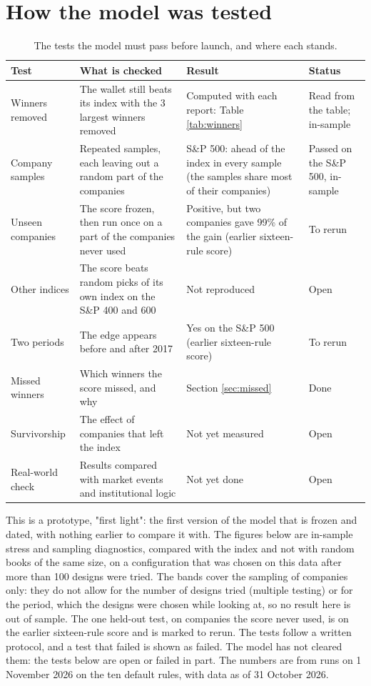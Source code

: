 \documentclass[11pt,a4paper]{article}
\begin{document}
\section{How the model was tested}
\label{sec:testing}
\begin{table}[H]
\centering
\small
\caption{The tests the model must pass before launch, and where each stands.}\label{tab:testing}
\begin{tabular}{l p{3.6cm} p{4.6cm} p{2.3cm}}
\hline
Test & What is checked & Result & Status \\
\hline
Winners removed & The wallet still beats its index with the 3 largest winners removed & Computed with each report: Table \ref{tab:winners} & Read from the table; in-sample \\
Company samples & Repeated samples, each leaving out a random part of the companies & S\&P 500: ahead of the index in every sample (the samples share most of their companies) & Passed on the S\&P 500, in-sample \\
Unseen companies & The score frozen, then run once on a part of the companies never used & Positive, but two companies gave 99\% of the gain (earlier sixteen-rule score) & To rerun \\
Other indices & The score beats random picks of its own index on the S\&P 400 and 600 & Not reproduced & Open \\
Two periods & The edge appears before and after 2017 & Yes on the S\&P 500 (earlier sixteen-rule score) & To rerun \\
Missed winners & Which winners the score missed, and why & Section \ref{sec:missed} & Done \\
Survivorship & The effect of companies that left the index & Not yet measured & Open \\
Real-world check & Results compared with market events and institutional logic & Not yet done & Open \\
\hline
\end{tabular}
\end{table}
This is a prototype, "first light": the first version of the model that is frozen and dated, with nothing earlier to compare it with. The figures below are in-sample stress and sampling diagnostics, compared with the index and not with random books of the same size, on a configuration that was chosen on this data after more than 100 designs were tried. The bands cover the sampling of companies only: they do not allow for the number of designs tried (multiple testing) or for the period, which the designs were chosen while looking at, so no result here is out of sample. The one held-out test, on companies the score never used, is on the earlier sixteen-rule score and is marked to rerun. The tests follow a written protocol, and a test that failed is shown as failed. The model has not cleared them: the tests below are open or failed in part. The numbers are from runs on 1 November 2026 on the ten default rules, with data as of 31 October 2026.
\end{document}
